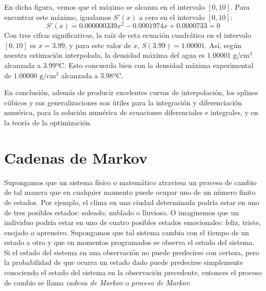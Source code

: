 \begin{example}
\begin{center}
    \end{center}\newpage\noindent
    En dicha figura, vemos que el máximo se alcanza en el intervalo $[0, 10]$. Para encontrar este máximo, igualamos $S'(x)$ a cero en el intervalo $[0, 10]$:
    $$S'(x) = 0.000000339x^2 - 0.0001974x + 0.0000733 = 0$$
    Con tres cifras significativas, la raíz de esta ecuación cuadrática en el intervalo $[0, 10]$ es $x = 3.99$, y para este valor de $x$, $S(3.99) = 1.00001$. Así, según nuestra estimación interpolada, la densidad máxima del agua es $1.00001$ $\mathrm{g}/\mathrm{cm}^3$ alcanzada a $3.99$º$\mathrm{C}$. Esto concuerda bien con la densidad máxima experimental de $1.00000$ $\mathrm{g}/\mathrm{cm}^3$ alcanzada a $3.98$º$\mathrm{C}$.
\end{example}

En conclusión, además de producir excelentes curvas de interpolación, los splines cúbicos y sus generalizaciones son útiles para la integración y diferenciación numérica, para la solución numérica de ecuaciones diferenciales e integrales, y en la teoría de la optimización.

\section{Cadenas de Markov}

Supongamos que un sistema físico o matemático atraviesa un proceso de cambio de tal manera que en cualquier momento puede ocupar uno de un número finito de estados. Por ejemplo, el clima en una ciudad determinada podría estar en uno de tres posibles estados: soleado, nublado o lluvioso. O imaginemos que un individuo podría estar en uno de cuatro posibles estados emocionales: feliz, triste, enojado o aprensivo. Supongamos que tal sistema cambia con el tiempo de un estado a otro y que en momentos programados se observa el estado del sistema. Si el estado del sistema en una observación no puede predecirse con certeza, pero la probabilidad de que ocurra un estado dado puede predecirse simplemente conociendo el estado del sistema en la observación precedente, entonces el proceso de cambio se llama \emph{cadena de Markov} o \emph{proceso de Markov}.

